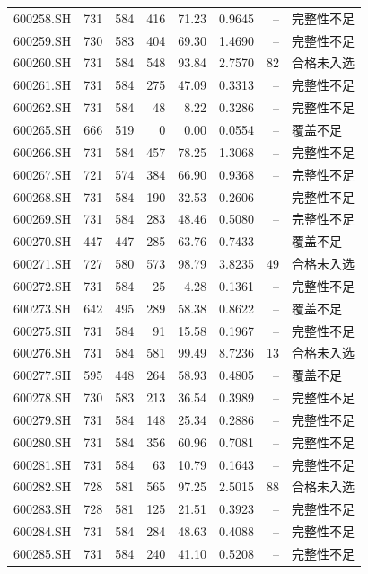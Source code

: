 \documentclass[10pt,a4paper]{article}
\begin{document}
\begin{longtable}{lrrr r r r l}
600258.SH & 731 & 584 & 416 & 71.23 & 0.9645 & -- & 完整性不足\\
600259.SH & 730 & 583 & 404 & 69.30 & 1.4690 & -- & 完整性不足\\
600260.SH & 731 & 584 & 548 & 93.84 & 2.7570 & 82 & 合格未入选\\
600261.SH & 731 & 584 & 275 & 47.09 & 0.3313 & -- & 完整性不足\\
600262.SH & 731 & 584 & 48 & 8.22 & 0.3286 & -- & 完整性不足\\
600265.SH & 666 & 519 & 0 & 0.00 & 0.0554 & -- & 覆盖不足\\
600266.SH & 731 & 584 & 457 & 78.25 & 1.3068 & -- & 完整性不足\\
600267.SH & 721 & 574 & 384 & 66.90 & 0.9368 & -- & 完整性不足\\
600268.SH & 731 & 584 & 190 & 32.53 & 0.2606 & -- & 完整性不足\\
600269.SH & 731 & 584 & 283 & 48.46 & 0.5080 & -- & 完整性不足\\
600270.SH & 447 & 447 & 285 & 63.76 & 0.7433 & -- & 覆盖不足\\
600271.SH & 727 & 580 & 573 & 98.79 & 3.8235 & 49 & 合格未入选\\
600272.SH & 731 & 584 & 25 & 4.28 & 0.1361 & -- & 完整性不足\\
600273.SH & 642 & 495 & 289 & 58.38 & 0.8622 & -- & 覆盖不足\\
600275.SH & 731 & 584 & 91 & 15.58 & 0.1967 & -- & 完整性不足\\
600276.SH & 731 & 584 & 581 & 99.49 & 8.7236 & 13 & 合格未入选\\
600277.SH & 595 & 448 & 264 & 58.93 & 0.4805 & -- & 覆盖不足\\
600278.SH & 730 & 583 & 213 & 36.54 & 0.3989 & -- & 完整性不足\\
600279.SH & 731 & 584 & 148 & 25.34 & 0.2886 & -- & 完整性不足\\
600280.SH & 731 & 584 & 356 & 60.96 & 0.7081 & -- & 完整性不足\\
600281.SH & 731 & 584 & 63 & 10.79 & 0.1643 & -- & 完整性不足\\
600282.SH & 728 & 581 & 565 & 97.25 & 2.5015 & 88 & 合格未入选\\
600283.SH & 728 & 581 & 125 & 21.51 & 0.3923 & -- & 完整性不足\\
600284.SH & 731 & 584 & 284 & 48.63 & 0.4088 & -- & 完整性不足\\
600285.SH & 731 & 584 & 240 & 41.10 & 0.5208 & -- & 完整性不足\\

\end{longtable}
\end{document}
